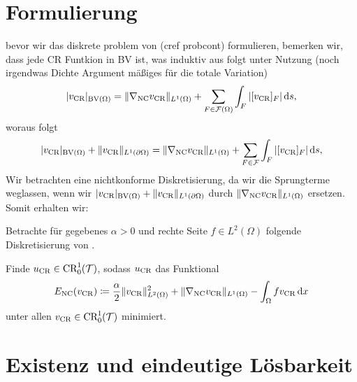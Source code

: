 
\section{Formulierung}

bevor wir das diskrete problem von (cref probcont) formulieren, bemerken wir,
dass jede CR Funtkion in BV ist, was induktiv aus
\cite[S. 404, Example 10.2.1]{ABM14} folgt unter Nutzung (noch irgendwas
Dichte Argument mäßiges für die totale Variation)
\begin{align*}
  |v_\textup{CR}|_{\textup{BV}(\Omega)} = \Vert \nabla_\textup{NC} v_\textup{CR}\Vert_{L^1(\Omega)} +
  \sum_{F\in\mathcal{F}(\Omega)}\int_F |[v_\textup{CR}]_F|\,\mathrm{d}s,
\end{align*}
woraus folgt
\begin{align*}
  |v_\textup{CR}|_{\textup{BV}(\Omega)} +\Vert v_\textup{CR}\Vert_{L^1(\partial\Omega)} 
  = \Vert \nabla_\textup{NC} v_\textup{CR}\Vert_{L^1(\Omega)} +
  \sum_{F\in\mathcal{F}}\int_F |[v_\textup{CR}]_F|\,\mathrm{d}s,
\end{align*}
Wir betrachten eine nichtkonforme Diskretisierung, da wir die Sprungterme
weglassen, wenn wir 
  $|v_\textup{CR}|_{\textup{BV}(\Omega)} +\Vert v_\textup{CR}\Vert_{L^1(\partial\Omega)}$
durch 
  $\Vert \nabla_\textup{NC} v_\textup{CR}\Vert_{L^1(\Omega)}$ ersetzen.
  Somit erhalten wir:

Betrachte für gegebenes $\alpha>0$ und rechte Seite $f\in L^2(\Omega)$ 
folgende Diskretisierung von . 

\begin{problem}\label{prob:discreteProblem}
  Finde $u_\textup{CR}\in \textup{CR}^1_0(\mathcal{T})$,
  sodass $u_\textup{CR}$ das Funktional
  \begin{align}\label{eq:discreteProblem}
    E_\textup{NC}(v_\textup{CR})\coloneqq \frac{\alpha}{2}\Vert v_\textup{CR}\Vert_{L^2(\Omega)}^2
    +\Vert \nabla_\textup{NC}v_\textup{CR}\Vert_{L^1(\Omega)}-\int_\Omega fv_\textup{CR}\,\mathrm{d}x
  \end{align}
  unter allen $v_\textup{CR}\in \textup{CR}^1_0(\mathcal{T})$ minimiert.
\end{problem}


\section{Existenz und eindeutige Lösbarkeit}

